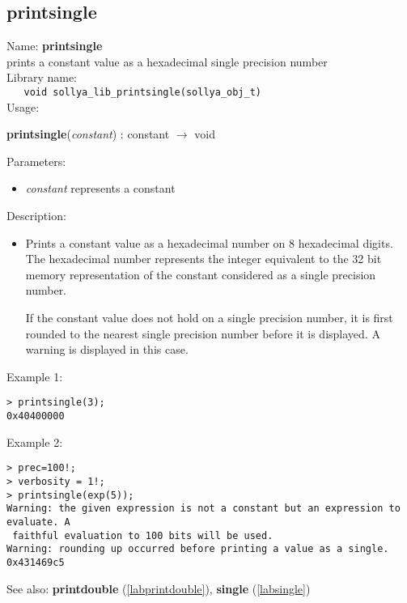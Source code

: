 \subsection{printsingle}
\label{labprintsingle}
\noindent Name: \textbf{printsingle}\\
\phantom{aaa}prints a constant value as a hexadecimal single precision number\\[0.2cm]
\noindent Library name:\\
\verb|   void sollya_lib_printsingle(sollya_obj_t)|\\[0.2cm]
\noindent Usage: 
\begin{center}
\textbf{printsingle}(\emph{constant}) : \textsf{constant} $\rightarrow$ \textsf{void}\\
\end{center}
Parameters: 
\begin{itemize}
\item \emph{constant} represents a constant
\end{itemize}
\noindent Description: \begin{itemize}

\item Prints a constant value as a hexadecimal number on 8 hexadecimal
   digits. The hexadecimal number represents the integer equivalent to
   the 32 bit memory representation of the constant considered as a
   single precision number.
    
   If the constant value does not hold on a single precision number, it
   is first rounded to the nearest single precision number before it is
   displayed. A warning is displayed in this case.
\end{itemize}
\noindent Example 1: 
\begin{center}\begin{minipage}{15cm}\begin{Verbatim}[frame=single,commandchars=\\\|\~]
> printsingle(3);
0x40400000
\end{Verbatim}
\end{minipage}\end{center}
\noindent Example 2: 
\begin{center}\begin{minipage}{15cm}\begin{Verbatim}[frame=single,commandchars=\\\|\~]
> prec=100!;
> verbosity = 1!;
> printsingle(exp(5));
Warning: the given expression is not a constant but an expression to evaluate. A
 faithful evaluation to 100 bits will be used.
Warning: rounding up occurred before printing a value as a single.
0x431469c5
\end{Verbatim}
\end{minipage}\end{center}
See also: \textbf{printdouble} (\ref{labprintdouble}), \textbf{single} (\ref{labsingle})

